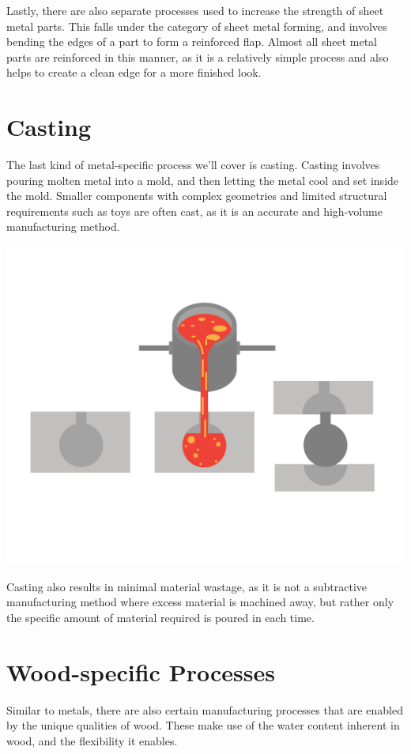 
Lastly, there are also separate processes used to increase the strength of sheet metal parts. This falls under the category of sheet metal forming, and involves bending the edges of a part to form a reinforced flap. Almost all sheet metal parts are reinforced in this manner, as it is a relatively simple process and also helps to create a clean edge for a more finished look.

\section{Casting}

The last kind of metal-specific process we’ll cover is casting. Casting involves pouring molten metal into a mold, and then letting the metal cool and set inside the mold. Smaller components with complex geometries and limited structural requirements such as toys are often cast, as it is an accurate and high-volume manufacturing method.

\includegraphics[width=.75\textwidth]{casting.png}


Casting also results in minimal material wastage, as it is not a subtractive manufacturing method where excess material is machined away, but rather only the specific amount of material required is poured in each time.

\section{Wood-specific Processes}

Similar to metals, there are also certain manufacturing processes that are enabled by the unique qualities of wood. These make use of the water content inherent in wood, and the flexibility it enables.

